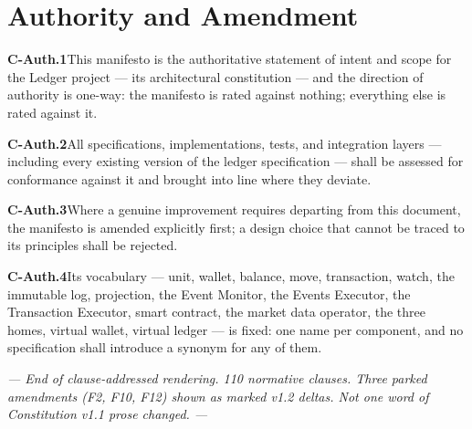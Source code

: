\documentclass[11pt,a4paper]{article}
\newcommand{\clause}[2]{\par\medskip\noindent\textbf{#1}\hspace{0.6em}#2}
\begin{document}
\section*{Authority and Amendment}

\clause{C-Auth.1}{This manifesto is the authoritative statement of intent and scope
for the Ledger project --- its architectural constitution --- and the direction of
authority is one-way: the manifesto is rated against nothing; everything else is
rated against it.}

\clause{C-Auth.2}{All specifications, implementations, tests, and integration
layers --- including every existing version of the ledger specification --- shall
be assessed for conformance against it and brought into line where they deviate.}

\clause{C-Auth.3}{Where a genuine improvement requires departing from this
document, the manifesto is amended explicitly first; a design choice that cannot be
traced to its principles shall be rejected.}

\clause{C-Auth.4}{Its vocabulary --- unit, wallet, balance, move, transaction,
watch, the immutable log, projection, the Event Monitor, the Events Executor, the
Transaction Executor, smart contract, the market data operator, the three homes,
virtual wallet, virtual ledger --- is fixed: one name per component, and no
specification shall introduce a synonym for any of them.}

\vfill
\begin{center}\small\itshape
--- End of clause-addressed rendering. 110 normative clauses. Three parked
amendments (F2, F10, F12) shown as marked v1.2 deltas. Not one word of
Constitution v1.1 prose changed. ---
\end{center}
\end{document}
